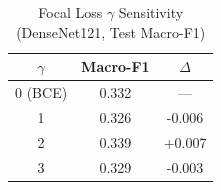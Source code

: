 \begin{table}[t]
\caption{Focal Loss $\gamma$ Sensitivity (DenseNet121, Test Macro-F1)}
\label{tab:gamma}
\centering
\begin{tabular}{ccc}
\toprule
$\gamma$ & Macro-F1 & $\Delta$ \\
\midrule
0 (BCE) & 0.332 & --- \\
1 & 0.326 & -0.006 \\
2 & 0.339 & +0.007 \\
3 & 0.329 & -0.003 \\
\bottomrule
\end{tabular}
\end{table}
